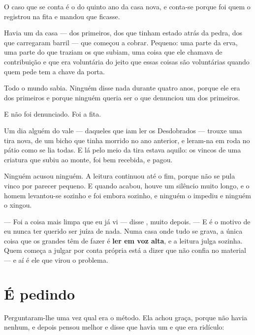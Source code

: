 \documentclass[livro.tex]{subfiles}
\begin{document}
\medskip

O caso que se conta é o do quinto ano da casa nova, e conta-se porque foi \Lua quem o registrou
na fita e mandou que ficasse.

Havia um da casa --- dos primeiros, dos que tinham estado atrás da pedra, dos que carregaram
barril --- que começou a cobrar. Pequeno: uma parte da erva, uma parte do que traziam os que
subiam, uma coisa que ele chamava de contribuição e que era voluntária do jeito que essas coisas
são voluntárias quando quem pede tem a chave da porta.

Todo o mundo sabia. Ninguém disse nada durante quatro anos, porque ele era dos primeiros e porque
ninguém queria ser o que denunciou um dos primeiros.

\medskip

E não foi denunciado. Foi a fita.

Um dia alguém do vale --- daqueles que iam ler os Desdobrados --- trouxe uma tira nova, de um
bicho que tinha morrido no ano anterior, e leram-na em roda no pátio como se lia todas. E lá
pelo meio da tira estava aquilo: os vincos de uma criatura que subiu ao monte, foi bem recebida,
e pagou.

Ninguém acusou ninguém. A leitura continuou até o fim, porque não se pula vinco por parecer
pequeno. E quando acabou, houve um silêncio muito longo, e o homem levantou-se sozinho e foi
embora sozinho, e ninguém o impediu e ninguém o xingou.

\medskip

--- Foi a coisa mais limpa que eu já vi --- disse \Lua , muito depois. --- E é o motivo de eu
nunca ter querido ser juíza de nada. Numa casa onde tudo se grava, a única coisa que os grandes
têm de fazer é \textbf{ler em voz alta}, e a leitura julga sozinha. Quem começa a julgar por
conta própria está a dizer que não confia no material --- e aí é ele que virou o problema.

\section{É pedindo}

Perguntaram-lhe uma vez qual era o método. Ela achou graça, porque não havia nenhum, e depois
pensou melhor e disse que havia um e que era ridículo:

\medskip
\end{document}
